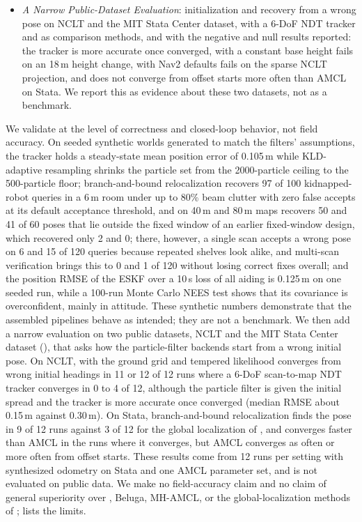 \begin{itemize}
  \item \emph{A Narrow Public-Dataset Evaluation}: initialization and recovery from a wrong pose on NCLT and the MIT Stata Center dataset, with a 6-DoF NDT tracker and  as comparison methods, and with the negative and null results reported: the tracker is more accurate once converged,  with a constant base height fails on an 18\,m height change,  with Nav2 defaults fails on the sparse NCLT projection, and  does not converge from offset starts more often than AMCL on Stata. We report this as evidence about these two datasets, not as a benchmark.
\end{itemize}

We validate \sname{} at the level of correctness and closed-loop behavior, not field accuracy. On seeded synthetic worlds generated to match the filters' assumptions, the  tracker holds a steady-state mean position error of 0.105\,m while KLD-adaptive resampling shrinks the particle set from the 2000-particle ceiling to the 500-particle floor; branch-and-bound relocalization recovers 97 of 100 kidnapped-robot queries in a 6\,m room under up to 80\% beam clutter with zero false accepts at its default acceptance threshold, and on 40\,m and 80\,m maps recovers 50 and 41 of 60 poses that lie outside the fixed window of an earlier fixed-window design, which recovered only 2 and 0; there, however, a single scan accepts a wrong pose on 6 and 15 of 120 queries because repeated shelves look alike, and multi-scan verification brings this to 0 and 1 of 120 without losing correct fixes overall; and the position RMSE of the ESKF over a 10\,s loss of all aiding is 0.125\,m on one seeded run, while a 100-run Monte Carlo NEES test shows that its covariance is overconfident, mainly in attitude. These synthetic numbers demonstrate that the assembled pipelines behave as intended; they are not a benchmark. We then add a narrow evaluation on two public datasets, NCLT and the MIT Stata Center dataset (), that asks how the particle-filter backends start from a wrong initial pose. On NCLT,  with the ground grid and tempered likelihood converges from wrong initial headings in 11 or 12 of 12 runs where a 6-DoF scan-to-map NDT tracker converges in 0 to 4 of 12, although the particle filter is given the initial spread and the tracker is more accurate once converged (median RMSE about 0.15\,m against 0.30\,m). On Stata, branch-and-bound relocalization finds the pose in 9 of 12 runs against 3 of 12 for the global localization of , and  converges faster than AMCL in the runs where it converges, but AMCL converges as often or more often from offset starts. These results come from 12 runs per setting with synthesized odometry on Stata and one AMCL parameter set, and  is not evaluated on public data. We make no field-accuracy claim and no claim of general superiority over , Beluga, MH-AMCL, or the global-localization methods of ;  lists the limits.
